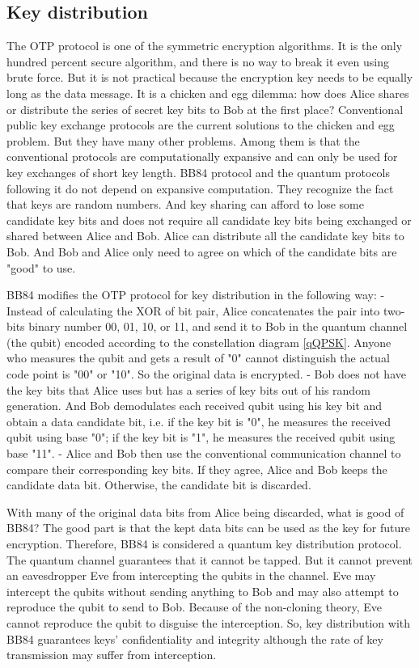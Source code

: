 \documentclass{book}
\begin{document}
\subsection{Key distribution}
The OTP protocol is one of the symmetric encryption algorithms. It is the only hundred percent secure algorithm, and there is no way to break it even using brute force. But it is not practical because the encryption key needs to be equally long as the data message. It is a chicken and egg dilemma: how does Alice shares or distribute the series of secret key bits to Bob at the first place? Conventional public key exchange protocols are the current solutions to the chicken and egg problem. But they have many other problems. Among them is that the conventional protocols are computationally expansive and can only be used for key exchanges of short key length. BB84 protocol and the quantum protocols following it do not depend on expansive computation. They recognize the fact that keys are random numbers. And key sharing can afford to lose some candidate key bits and does not require all candidate key bits being exchanged or shared between Alice and Bob. Alice can distribute all the candidate key bits to Bob. And Bob and Alice only need to agree on which of the candidate bits are "good" to use.

BB84 modifies the OTP protocol for key distribution in the following way:
- Instead of calculating the XOR of bit pair, Alice concatenates the pair into two-bits binary number 00, 01, 10, or 11, and send it to Bob in the quantum channel (the qubit) encoded according to the constellation diagram \ref{qQPSK}. Anyone who measures the qubit and gets a result of "0" cannot distinguish the actual code point is "00" or "10". So the original data is encrypted.
- Bob does not have the key bits that Alice uses but has a series of key bits out of his random generation. And Bob demodulates each received qubit using his key bit and obtain a data candidate bit, i.e. if the key bit is "0", he measures the received qubit using base "0"; if the key bit is "1", he measures the received qubit using base "11".
- Alice and Bob then use the conventional communication channel to compare their corresponding key bits. If they agree, Alice and Bob keeps the candidate data bit. Otherwise, the candidate bit is discarded.

With many of the original data bits from Alice being discarded, what is good of BB84? The good part is that the kept data bits can be used as the key for future encryption. Therefore, BB84 is considered a quantum key distribution protocol. The quantum channel guarantees that it cannot be tapped. But it cannot prevent an eavesdropper Eve from intercepting the qubits in the channel. Eve may intercept the qubits without sending anything to Bob and may also attempt to reproduce the qubit to send to Bob. Because of the non-cloning theory, Eve cannot reproduce the qubit to disguise the interception. So, key distribution with BB84 guarantees keys' confidentiality and integrity although the rate of key transmission may suffer from interception.
\end{document}
